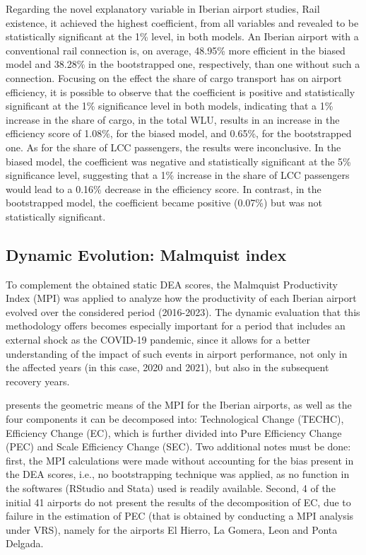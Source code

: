 \vspace{-0.5cm}
 Regarding the novel explanatory variable in Iberian airport studies, Rail existence, it achieved the
highest coefficient, from all variables and revealed to be statistically significant at the 1\% level, in both
models. An Iberian airport with a conventional rail connection is, on average, 48.95\% more efficient in
the biased model and 38.28\% in the bootstrapped one, respectively, than one without such a connection. Focusing on the effect the share of cargo transport has on airport efficiency, it is possible to observe
that the coefficient is positive and statistically significant at the 1\% significance level in both models,
indicating that a 1\% increase in the share of cargo, in the total WLU, results in an increase in the
efficiency score of 1.08\%, for the biased model, and 0.65\%, for the bootstrapped one. As for the share of LCC passengers, the results were inconclusive. In the biased model, the coefficient was negative and statistically significant at the 5\% significance level, suggesting that a 1\% increase
in the share of LCC passengers would lead to a 0.16\% decrease in the efficiency score. In contrast, in
the bootstrapped model, the coefficient became positive (0.07\%) but was not statistically significant.





\subsection{Dynamic Evolution: Malmquist index}
\label{subsec:resul_malm}
To complement the obtained static DEA scores, the Malmquist Productivity Index
(MPI) was applied to analyze how the productivity of each Iberian airport evolved over the considered
period (2016-2023). The dynamic evaluation that this methodology offers becomes especially important
for a period that includes an external shock as the COVID-19 pandemic, since it allows for a better
understanding of the impact of such events in airport performance, not only in the affected years (in this
case, 2020 and 2021), but also in the subsequent recovery years.

 presents the geometric means of the MPI for the Iberian airports, as well as the four components it can be decomposed into: Technological Change (TECHC), Efficiency Change (EC), which is further divided into Pure Efficiency Change (PEC) and Scale Efficiency Change (SEC). Two additional notes must be done: first, the MPI calculations were made without accounting for the bias present in
the DEA scores, i.e., no bootstrapping technique was applied, as no function in the softwares (RStudio
and Stata) used is readily available. Second, 4 of the initial 41 airports do not present the results of
the decomposition of EC, due to failure in the estimation of PEC (that is obtained by conducting a MPI
analysis under VRS), namely for the airports El Hierro, La Gomera, Leon and Ponta Delgada.


